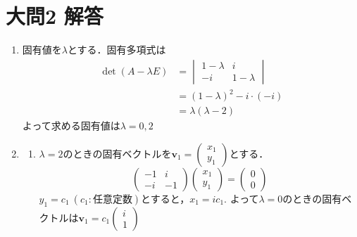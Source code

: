 \documentclass[dvipdfmx]{jsreport}
\begin{document}
\section{大問2 解答}
\begin{souanswer} %
\begin{enumerate}
	\item 固有値を$\lambda$とする．固有多項式は
\begin{align*}
	\det{(A- \lambda E)}
&= \begin{vmatrix}
	1- \lambda& i\\
	-i& 1- \lambda
\end{vmatrix}\\
&= (1- \lambda)^2- i\cdot (-i)\\
&= \lambda(\lambda- 2)
\end{align*}
	よって求める固有値は$\lambda= 0, 2$
	\item 
\begin{enumerate}
	\item $\lambda= 2$のときの固有ベクトルを$\bm{v}_1=\begin{pmatrix}x_1\\ y_1\end{pmatrix}$とする．
\begin{equation*}
	\begin{pmatrix}-1& i\\ -i& -1\end{pmatrix}\begin{pmatrix}x_1\\ y_1\end{pmatrix}= \begin{pmatrix}0\\ 0\end{pmatrix}
\end{equation*}
	$y_1= c_1\ (c_1\colon 任意定数)$とすると，$x_1= ic_1$.
	よって$\lambda= 0$のときの固有ベクトルは$\bm{v}_1= c_1\begin{pmatrix}i\\ 1\end{pmatrix}$


\end{enumerate}
\end{enumerate}
\end{souanswer}
\end{document}
